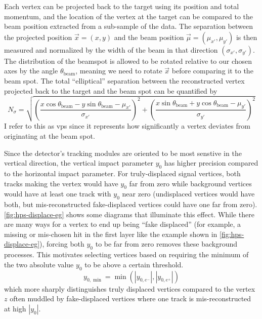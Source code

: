 Each vertex can be projected back to the target using its position and total momentum,
and the location of the vertex at the target can be compared to the beam
position extracted from a sub-sample of the data.
The separation between the projected position $\vec{x} = (x,y)$ and the beam position
$\vec{\mu} = (\mu_{x'}, \mu_{y'})$ is then measured
and normalized by the width of the beam in that direction $(\sigma_{x'},\sigma_{y'})$.
The distribution of the beamspot is allowed to be rotated relative to our
chosen axes by the angle $\theta_\mathrm{beam}$, meaning we need to rotate $\vec{x}$
before comparing it to the beam spot.
The total ``elliptical'' separation between the reconstructed vertex
projected back to the target and the beam spot can be quantified by
\begin{equation}
  N_\sigma = \sqrt{
    \left(
      \frac{x\cos\theta_\mathrm{beam} - y\sin\theta_\mathrm{beam} - \mu_{x'}}{\sigma_{x'}}
    \right)^2
    +\left(
      \frac{x\sin\theta_\mathrm{beam} + y\cos\theta_\mathrm{beam} - \mu_{y'}}{\sigma_{y'}}
    \right)^2
  }
\end{equation}
I refer to this as \ac{vps} since it represents how significantly
a vertex deviates from originating at the beam spot.

Since the detector's tracking modules are oriented to be most senstive in the
vertical direction, the vertical impact parameter $y_0$ has higher precision compared
to the horizontal impact parameter.
For truly-displaced signal vertices, both tracks making the vertex would have
$y_0$ far from zero while background vertices would have at least one track
with $y_0$ near zero (undisplaced vertices would have both, but mis-reconstructed
fake-displaced vertices could have one far from zero).
\cref{fig:hps-displace-eg} shows some diagrams that illuminate this effect.
While there are many ways for a vertex to end up being ``fake displaced''
(for example, a missing or mis-chosen hit in the first layer like the example shown
in \cref{fig:hps-displace-eg}), forcing both $y_0$ to be far from zero removes
these background processes.
This motivates selecting vertices based on requiring the minimum of the two
absolute value $y_0$ to be above a certain threshold.
\begin{equation}
  y_{0,\min} = \min(|y_{0,e^-}|,|y_{0,e^+}|)
\end{equation}
which more sharply distinguishes truly displaced vertices compared to the
vertex $z$ often muddled by fake-displaced vertices where one track is
mis-reconstructed at high $|y_0|$.

